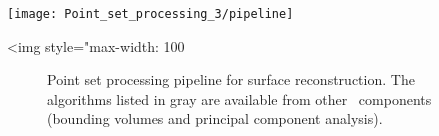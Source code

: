 \begin{center}
    \begin{ccTexOnly}
        \texttt{[image: Point\_set\_processing\_3/pipeline]} %
    \end{ccTexOnly}
    \begin{ccHtmlOnly}
        <img style="max-width: 100%
    \end{ccHtmlOnly}
    \begin{figure}[h]
        \caption{Point set processing pipeline for surface reconstruction.
                 The algorithms listed in gray are available from other
                 \cgal\ components (bounding volumes and principal
                 component analysis).}
        \label{Point_set_processing_3-fig-pipeline}
    \end{figure}
\end{center}


